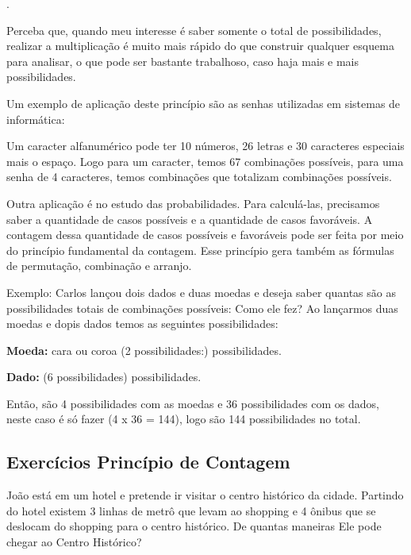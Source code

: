 \begin{multicols*}{2}
	.

	Perceba que, quando meu interesse é saber somente o total de possibilidades, realizar a multiplicação é muito mais rápido do que construir qualquer esquema para analisar, o que pode ser bastante trabalhoso, caso haja mais e mais possibilidades.

	Um exemplo de aplicação deste princípio são as senhas utilizadas em sistemas de informática:

	Um caracter alfanumérico pode ter 10 números, 26 letras e 30 caracteres especiais mais o espaço. Logo para um caracter, temos 67 combinações possíveis, para uma senha de 4 caracteres, temos  combinações que totalizam   combinações possíveis.

	Outra aplicação é no estudo das probabilidades. Para calculá-las, precisamos saber a quantidade de casos possíveis e a quantidade de casos favoráveis. A contagem dessa quantidade de casos possíveis e favoráveis pode ser feita por meio do princípio fundamental da contagem. Esse princípio gera também as fórmulas de permutação, combinação e arranjo.

	Exemplo: Carlos lançou dois dados e duas moedas e deseja saber quantas são as possibilidades totais de combinações possíveis: Como ele fez?
	Ao lançarmos duas moedas e dopis dados temos as seguintes possibilidades:

	\textbf{Moeda:} cara ou coroa (2 possibilidades:)   possibilidades.

	\textbf{Dado:}  (6 possibilidades)  possibilidades.

	Então, são 4 possibilidades com as moedas e 36 possibilidades com os dados, neste caso é só fazer (4 x 36 = 144), logo são 144 possibilidades no total.

	\subsection{Exercícios Princípio de Contagem}

\setcounter{numexercicio}{0}
		\execnum João está em um hotel e pretende ir visitar o centro histórico da cidade. Partindo do hotel existem 3 linhas de metrô que levam ao shopping e 4 ônibus que se deslocam do shopping para o centro histórico. De quantas maneiras Ele pode chegar ao Centro Histórico?


\end{multicols*}
